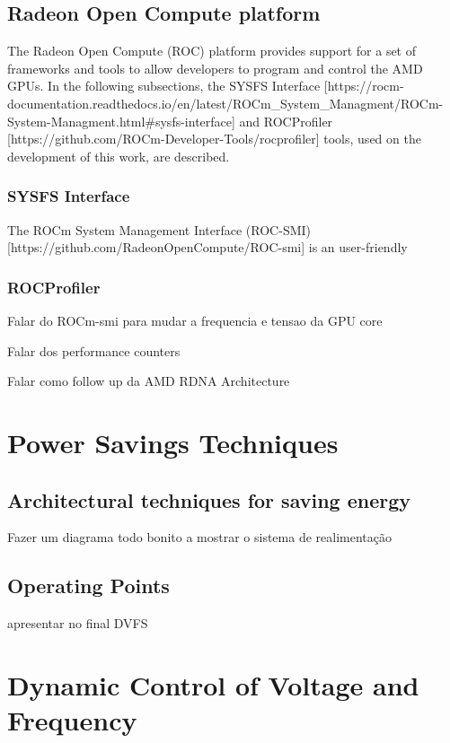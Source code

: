 \subsection{Radeon Open Compute platform}

The Radeon Open Compute (ROC) platform provides support for a set of frameworks and tools to allow developers to program and control the AMD GPUs.  In the following subsections, the SYSFS Interface [https://rocm-documentation.readthedocs.io/en/latest/ROCm_System_Managment/ROCm-System-Managment.html#sysfs-interface] and ROCProfiler [https://github.com/ROCm-Developer-Tools/rocprofiler] tools, used on the development of this work, are described.

\subsubsection{SYSFS Interface}

The ROCm System Management Interface (ROC-SMI) [https://github.com/RadeonOpenCompute/ROC-smi] is an user-friendly
\subsubsection{ROCProfiler}


Falar do ROCm-smi para mudar a frequencia e tensao da GPU core

Falar dos performance counters

Falar como follow up da AMD RDNA Architecture
\section{Power Savings Techniques}
\label{section:overview}

\subsection{Architectural techniques for saving energy}
Fazer um diagrama todo bonito a mostrar o sistema de realimentação
\subsection{Operating Points}
\label{section:dvfs}
apresentar no final DVFS 

\section{Dynamic Control of Voltage and Frequency}
